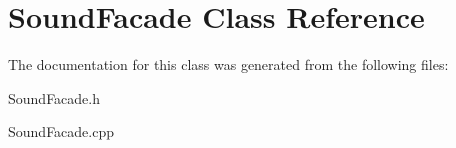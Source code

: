 \hypertarget{class_sound_facade}{}\section{Sound\+Facade Class Reference}
\label{class_sound_facade}


The documentation for this class was generated from the following files\+:\begin{DoxyCompactItemize}
\item 
Sound\+Facade.\+h\item 
Sound\+Facade.\+cpp\end{DoxyCompactItemize}
